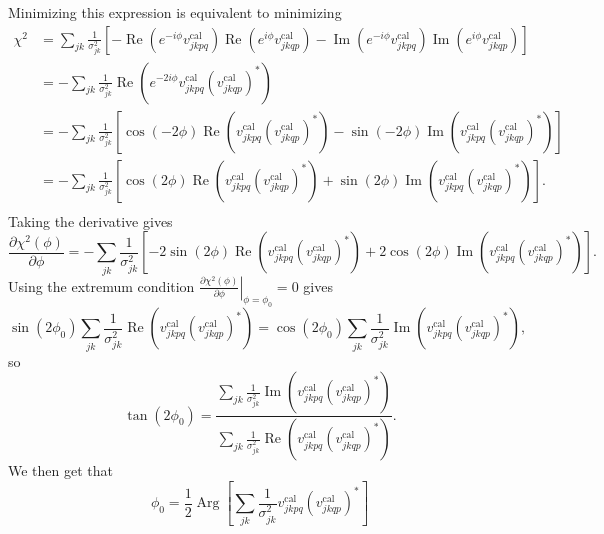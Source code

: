 \documentclass{article}
\newcommand\re{\operatorname{Re}}
\newcommand\im{\operatorname{Im}}
\begin{document}
Minimizing this expression is equivalent to minimizing
\begin{equation}
\begin{split}
    \chi^2 &= \sum_{jk} \frac{1}{\sigma^2_{jk}} \left[ - \re \left( e^{-i \phi} v^\text{cal}_{jkpq} \right) \re
    \left( e^{i \phi} v^\text{cal}_{jkqp} \right) - \im \left( e^{-i \phi} v^\text{cal}_{jkpq} \right) \im
    \left( e^{i \phi} v^\text{cal}_{jkqp} \right) \right] \\
    &= - \sum_{jk} \frac{1}{\sigma^2_{jk}} \re \left( e^{-2 i \phi} v^\text{cal}_{jkpq} (v^\text{cal}_{jkqp})^* \right) \\
    &= - \sum_{jk} \frac{1}{\sigma^2_{jk}} \left[ \cos(-2 \phi) \re \left( v^\text{cal}_{jkpq} (v^\text{cal}_{jkqp})^* \right) - \sin(-2 \phi) \im \left( v^\text{cal}_{jkpq} (v^\text{cal}_{jkqp})^* \right)  \right] \\
    &= - \sum_{jk} \frac{1}{\sigma^2_{jk}} \left[ \cos(2 \phi) \re \left( v^\text{cal}_{jkpq} (v^\text{cal}_{jkqp})^* \right) + \sin(2 \phi) \im \left( v^\text{cal}_{jkpq} (v^\text{cal}_{jkqp})^* \right)  \right]. \\
\end{split}
\end{equation}
Taking the derivative gives
\begin{equation}
    \frac{\partial \chi^2(\phi)}{\partial \phi} = - \sum_{jk} \frac{1}{\sigma^2_{jk}} \left[ -2 \sin(2 \phi) \re \left( v^\text{cal}_{jkpq} (v^\text{cal}_{jkqp})^* \right) + 2 \cos(2 \phi) \im \left( v^\text{cal}_{jkpq} (v^\text{cal}_{jkqp})^* \right)  \right].
\end{equation}
Using the extremum condition $\left. \frac{\partial \chi^2(\phi)}{\partial \phi} \right|_{\phi=\phi_0} = 0$ gives
\begin{equation}
    \sin(2 \phi_0) \sum_{jk} \frac{1}{\sigma^2_{jk}} \re \left( v^\text{cal}_{jkpq} (v^\text{cal}_{jkqp})^* \right) = \cos(2 \phi_0) \sum_{jk} \frac{1}{\sigma^2_{jk}} \im \left( v^\text{cal}_{jkpq} (v^\text{cal}_{jkqp})^* \right),
\end{equation}
so
\begin{equation}
    \tan (2 \phi_0) = \frac{\sum_{jk} \frac{1}{\sigma^2_{jk}} \im \left( v^\text{cal}_{jkpq} (v^\text{cal}_{jkqp})^* \right)}{\sum_{jk} \frac{1}{\sigma^2_{jk}} \re \left( v^\text{cal}_{jkpq} (v^\text{cal}_{jkqp})^* \right)}.
\end{equation}
We then get that
\begin{equation}
    \phi_0 = \frac{1}{2} \operatorname{Arg} \left[ \sum_{jk} \frac{1}{\sigma^2_{jk}} v^\text{cal}_{jkpq} (v^\text{cal}_{jkqp})^*\right]
\end{equation}
\end{document}

